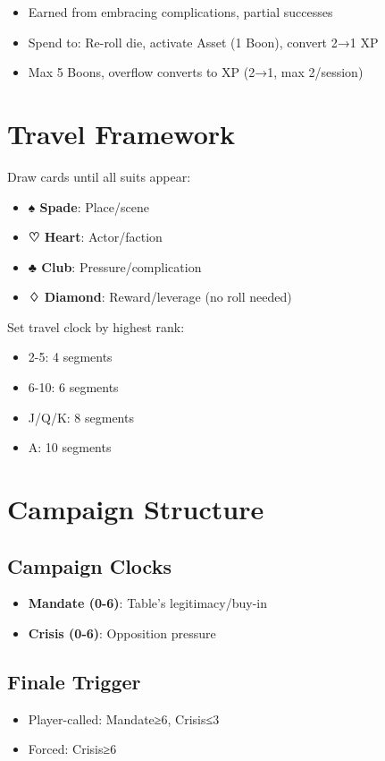 \documentclass[11pt]{article}
\begin{document}
\begin{itemize}
    \item Earned from embracing complications, partial successes
    \item Spend to: Re-roll die, activate Asset (1 Boon), convert 2→1 XP
    \item Max 5 Boons, overflow converts to XP (2→1, max 2/session)
\end{itemize}

\section{Travel Framework}

Draw cards until all suits appear:
\begin{itemize}
    \item \textbf{♠ Spade}: Place/scene
    \item \textbf{♡ Heart}: Actor/faction  
    \item \textbf{♣ Club}: Pressure/complication
    \item \textbf{♢ Diamond}: Reward/leverage (no roll needed)
\end{itemize}

Set travel clock by highest rank:
\begin{itemize}
    \item 2-5: 4 segments
    \item 6-10: 6 segments
    \item J/Q/K: 8 segments  
    \item A: 10 segments
\end{itemize}

\section{Campaign Structure}

\subsection{Campaign Clocks}
\begin{itemize}
    \item \textbf{Mandate (0-6)}: Table's legitimacy/buy-in
    \item \textbf{Crisis (0-6)}: Opposition pressure
\end{itemize}

\subsection{Finale Trigger}
\begin{itemize}
    \item Player-called: Mandate≥6, Crisis≤3
    \item Forced: Crisis≥6
\end{itemize}
\end{document}
